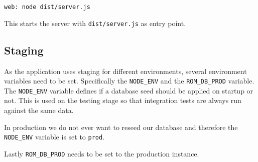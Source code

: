 \verb+web: node dist/server.js+

This starts the  server with \verb+dist/server.js+ as entry point.

\subsection{Staging}
As the application uses staging for different environments, several environment variables need to be set.
Specifically the \verb+NODE_ENV+ and the \verb+ROM_DB_PROD+ variable. 
The \verb+NODE_ENV+ variable defines if a database seed should be applied on startup or not. 
This is used on the testing stage so that integration tests are always run against the same data.

In production we do not ever want to reseed our database and therefore the \verb+NODE_ENV+ variable is set to \verb+prod+.

Lastly \verb+ROM_DB_PROD+ needs to be set to the production  instance.